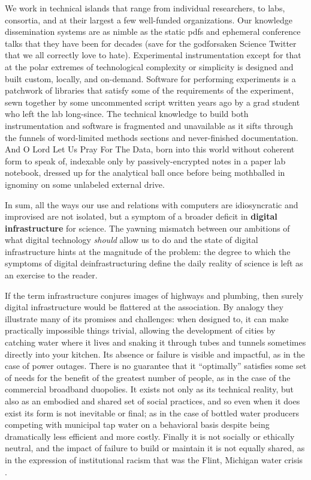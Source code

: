 \documentclass[11pt]{article}
\begin{document}
\begin{multicols}{2}
 We work in technical islands that range from individual
researchers, to labs, consortia, and at their largest a few well-funded
organizations. Our knowledge dissemination systems are as nimble as the
static pdfs and ephemeral conference talks that they have been for
decades (save for the godforsaken Science Twitter that we all correctly
love to hate). Experimental instrumentation except for that at the polar
extremes of technological complexity or simplicity is designed and built
custom, locally, and on-demand. Software for performing experiments is a
patchwork of libraries that satisfy some of the requirements of the
experiment, sewn together by some uncommented script written years ago
by a grad student who left the lab long-since. The technical knowledge
to build both instrumentation and software is fragmented and unavailable
as it sifts through the funnels of word-limited methods sections and
never-finished documentation. And O Lord Let Us Pray For The Data, born
into this world without coherent form to speak of, indexable only by
passively-encrypted notes in a paper lab notebook, dressed up for the
analytical ball once before being mothballed in ignominy on some
unlabeled external drive.

In sum, all the ways our use and relations with computers are
idiosyncratic and improvised are not isolated, but a symptom of a
broader deficit in \textbf{digital infrastructure} for science. The
yawning mismatch between our ambitions of what digital technology
\emph{should} allow us to do and the state of digital infrastructure
hints at the magnitude of the problem: the degree to which the symptoms
of digital deinfrastructuring define the daily reality of science is
left as an exercise to the reader.

If the term infrastructure conjures images of highways and plumbing,
then surely digital infrastructure would be flattered at the
association. By analogy they illustrate many of its promises and
challenges: when designed to, it can make practically impossible things
trivial, allowing the development of cities by catching water where it
lives and snaking it through tubes and tunnels sometimes directly into
your kitchen. Its absence or failure is visible and impactful, as in the
case of power outages. There is no guarantee that it ``optimally''
satisfies some set of needs for the benefit of the greatest number of
people, as in the case of the commercial broadband duopolies. It exists
not only as its technical reality, but also as an embodied and shared
set of social practices, and so even when it does exist its form is not
inevitable or final; as in the case of bottled water producers competing
with municipal tap water on a behavioral basis despite being
dramatically less efficient and more costly. Finally it is not socially
or ethically neutral, and the impact of failure to build or maintain it
is not equally shared, as in the expression of institutional racism that
was the Flint, Michigan water crisis \cite{michicancivilrightscommissionFlintWaterCrisis2017} .


\end{multicols}
\end{document}
